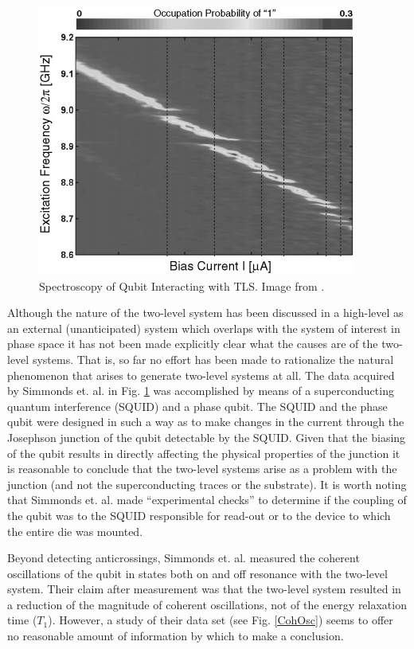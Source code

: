 \documentclass[aps,prl,reprint,groupedaddress]{revtex4-1}
\begin{document}
\begin{figure}%
\includegraphics[width=1.1\columnwidth,natwidth=395,natheight=337]{../TLS_Location_SpectroscopyBW.png}%
\caption{Spectroscopy of Qubit Interacting with TLS. Image from \cite{simmonds_decoherence_2004}. }%
\label{TLS1}%
\end{figure}
Although the nature of the two-level system has been discussed in a high-level as an external (unanticipated) system which overlaps with the system of interest in phase space it has not been made explicitly clear what the causes are of the two-level systems. That is, so far no effort has been made to rationalize the natural phenomenon that arises to generate two-level systems at all. The data acquired by Simmonds et. al. in Fig. \ref{TLS1} was accomplished by means of a superconducting quantum interference (SQUID) and a phase qubit. The SQUID and the phase qubit were designed in such a way as to make changes in the current through the Josephson junction of the qubit detectable by the SQUID. Given that the biasing of the qubit results in directly affecting the physical properties of the junction it is reasonable to conclude that the two-level systems arise as a problem with the junction (and not the superconducting traces or the substrate). It is worth noting that Simmonds et. al. made ``experimental checks'' to determine if the coupling of the qubit was to the SQUID responsible for read-out or to the device to which the entire die was mounted.

Beyond detecting anticrossings, Simmonds et. al. measured the coherent oscillations of the qubit in states both on and off resonance with the two-level system. Their claim after measurement was that the two-level system resulted in a reduction of the magnitude of coherent oscillations, not of the energy relaxation time ($T_1$). However, a study of their data set (see Fig. \ref{CohOsc}) seems to offer no reasonable amount of information by which to make a conclusion. 
\end{document}
